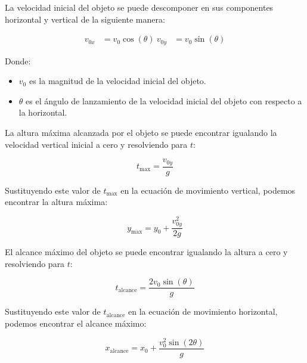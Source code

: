 \documentclass{article}
\begin{document}
\begin{multicols}{2}
La velocidad inicial del objeto se puede descomponer en sus componentes horizontal y vertical de la siguiente manera:

\begin{align}
v_{0x} &= v_0 \cos(\theta) \
v_{0y} &= v_0 \sin(\theta)
\end{align}

Donde:
\begin{itemize}
\item $v_0$ es la magnitud de la velocidad inicial del objeto.
\item $\theta$ es el ángulo de lanzamiento de la velocidad inicial del objeto con respecto a la horizontal.
\end{itemize}

La altura máxima alcanzada por el objeto se puede encontrar igualando la velocidad vertical inicial a cero y resolviendo para $t$:

\begin{equation}
t_{\text{max}} = \frac{v_{0y}}{g}
\end{equation}

Sustituyendo este valor de $t_{\text{max}}$ en la ecuación de movimiento vertical, podemos encontrar la altura máxima:

\begin{equation}
y_{\text{max}} = y_0 + \frac{v_{0y}^2}{2g}
\end{equation}

El alcance máximo del objeto se puede encontrar igualando la altura a cero y resolviendo para $t$:

\begin{equation}
t_{\text{alcance}} = \frac{2v_0 \sin(\theta)}{g}
\end{equation}

Sustituyendo este valor de $t_{\text{alcance}}$ en la ecuación de movimiento horizontal, podemos encontrar el alcance máximo:

\begin{equation}
x_{\text{alcance}} = x_0 + \frac{v_0^2 \sin(2\theta)}{g}
\end{equation}


\end{multicols}
\end{document}
